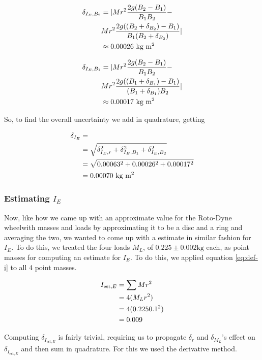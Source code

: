 \documentclass[coverpage]{article}
\newcommand{\iUnit}{\text{kg $\text{m}^2$}}
\newcommand{\rwheel}{Roto-Dyne wheel}
\begin{document}
	\begin{align}
		\delta_{I_E, B_2} &= |M r^2 \frac{2g(B_2 - B_1)}{B_1 B_2} - \notag \\
		&M r^2 \frac{2g((B_2 + \delta_{B_2}) - B_1)}{B_1 (B_2 + \delta_{B_2})}| \notag \\
		&\approx 0.00026\ \iUnit
	\end{align}

	\begin{align}
		\delta_{I_E, B_1} &= |M r^2 \frac{2g(B_2 - B_1)}{B_1 B_2} - \notag \\
		&M r^2 \frac{2g((B_1 + \delta_{B_1}) - B_1)}{(B_1 + \delta_{B_1}) B_2}| \notag \\
		&\approx 0.00017\ \iUnit
	\end{align}

	So, to find the overall uncertainty we add in quadrature, getting
	
	\begin{align}
		\delta_{I_E} &= \\
		&= \sqrt{\delta_{I_E, r}^2 + \delta_{I_E, B_1}^2 + \delta_{I_E, B_2}^2} \notag \\
		&= \sqrt{0.00063^2 + 0.00026^2 + 0.00017^2} \notag \\
		&= 0.00070\ \iUnit
	\end{align}

	\subsubsection{Estimating $I_E$}
	
	Now, like how we came up with an approximate value for the \rwheel with masses and loads by approximating it to be a disc and a ring and averaging the two, we wanted to come up with a estimate in similar fashion for $I_E$. To do this, we treated the four loads $M_L$, of $0.225 \pm 0.002 \text{kg}$ each, as point masses for computing an estimate for $I_E$. To do this, we applied equation \ref{eq:def-i} to all 4 point masses.
	
	\begin{align}
		I_{\text{est}, E} &= \sum{M r^2} \notag \\
		&= 4 (M_L r^2) \notag \\
		&= 4 (0.225 0.1^2) \notag \\
		&= 0.009
	\end{align}
	
	Computing $\delta_{I_{\text{est}, E}}$ is fairly trivial, requiring us to propagate $\delta_r$ and $\delta_{M_L}$'s effect on $\delta_{I_{\text{est}, E}}$ and then sum in quadrature. For this we used the derivative method.
	
\end{document}
